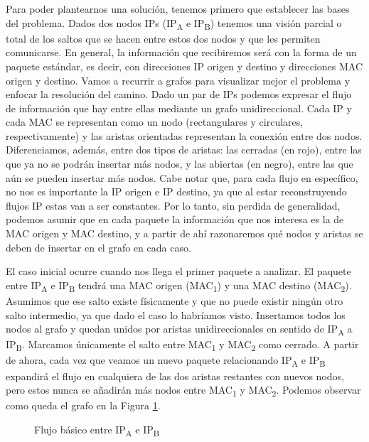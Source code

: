 \documentclass[twoside, 12pt]{epstfg}
\begin{document}
Para poder plantearnos una solución, tenemos primero que establecer las bases del problema. Dados dos nodos IPs (IP\textsubscript{A} e IP\textsubscript{B}) tenemos una visión parcial o total de los saltos que se hacen entre estos dos nodos y que les permiten comunicarse. En general, la información que recibiremos será con la forma de un paquete estándar, es decir, con direcciones IP origen y destino y direcciones MAC origen y destino. Vamos a recurrir a grafos para visualizar mejor el problema y enfocar la resolución del camino. Dado un par de IPs podemos expresar el flujo de información que hay entre ellas mediante un grafo unidireccional. Cada IP y cada MAC se representan como un nodo (rectangulares y circulares, respectivamente) y las aristas orientadas representan la conexión entre dos nodos. Diferenciamos, además, entre dos tipos de aristas: las cerradas (en rojo), entre las que ya no se podrán insertar más nodos, y las abiertas (en negro), entre las que aún se pueden insertar más nodos. Cabe notar que, para cada flujo en específico, no nos es importante la IP origen e IP destino, ya que al estar reconstruyendo flujos IP estas van a ser constantes. Por lo tanto, sin perdida de generalidad, podemos asumir que en cada paquete la información que nos interesa es la de MAC origen y MAC destino, y a partir de ahí razonaremos qué nodos y aristas se deben de insertar en el grafo en cada caso. 

El caso inicial ocurre cuando nos llega el primer paquete a analizar. El paquete entre IP\textsubscript{A} e IP\textsubscript{B} tendrá una MAC origen (MAC\textsubscript{1}) y una MAC destino (MAC\textsubscript{2}). Asumimos que ese salto existe físicamente y que no puede existir ningún otro salto intermedio, ya que dado el caso lo habríamos visto. Insertamos todos los nodos al grafo y quedan unidos por aristas unidireccionales en sentido de IP\textsubscript{A} a IP\textsubscript{B}. Marcamos únicamente el salto entre MAC\textsubscript{1} y MAC\textsubscript{2} como cerrado. A partir de ahora, cada vez que veamos un nuevo paquete relacionando IP\textsubscript{A} e IP\textsubscript{B} expandirá el flujo en cualquiera de las dos aristas restantes con nuevos nodos, pero estos nunca se añadirán más nodos entre MAC\textsubscript{1} y MAC\textsubscript{2}. Podemos observar como queda el grafo en la Figura \ref{fig:Analisis:BasicFlow}.
\begin{figure}[H]
\centering

\caption[Flujo básico entre dos IPs]{Flujo básico entre IP\textsubscript{A} e IP\textsubscript{B}}
\label{fig:Analisis:BasicFlow}
\end{figure}
\end{document}
